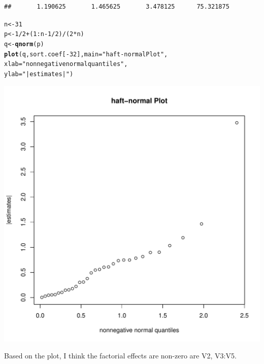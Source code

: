 \documentclass{article}\usepackage[]{graphicx}\usepackage[]{color}
\makeatletter
\def\maxwidth{ %
  \ifdim\Gin@nat@width>\linewidth
    \linewidth
  \else
    \Gin@nat@width
  \fi
}
\newcommand{\hlnum}[1]{\textcolor[rgb]{0.686,0.059,0.569}{#1}}%
\newcommand{\hlstr}[1]{\textcolor[rgb]{0.192,0.494,0.8}{#1}}%
\newcommand{\hlopt}[1]{\textcolor[rgb]{0,0,0}{#1}}%
\newcommand{\hlstd}[1]{\textcolor[rgb]{0.345,0.345,0.345}{#1}}%
\newcommand{\hlkwb}[1]{\textcolor[rgb]{0.69,0.353,0.396}{#1}}%
\newcommand{\hlkwc}[1]{\textcolor[rgb]{0.333,0.667,0.333}{#1}}%
\newcommand{\hlkwd}[1]{\textcolor[rgb]{0.737,0.353,0.396}{\textbf{#1}}}%
\newenvironment{kframe}{%
 \def\at@end@of@kframe{}%
 \ifinner\ifhmode%
  \def\at@end@of@kframe{\end{minipage}}%
  \begin{minipage}{\columnwidth}%
 \fi\fi%
 \def\FrameCommand##1{\hskip\@totalleftmargin \hskip-\fboxsep
 \colorbox{shadecolor}{##1}\hskip-\fboxsep
     \hskip-\linewidth \hskip-\@totalleftmargin \hskip\columnwidth}%
 \MakeFramed {\advance\hsize-\width
   \@totalleftmargin\z@ \linewidth\hsize
   \@setminipage}}%
 {\par\unskip\endMakeFramed%
 \at@end@of@kframe}
\newenvironment{knitrout}{}{} %
\makeatother
\begin{document}
\begin{knitrout}
\begin{kframe}
\begin{verbatim}
##       1.190625       1.465625       3.478125      75.321875
\end{verbatim}
\begin{alltt}
\hlstd{n} \hlkwb{<-} \hlnum{31}
\hlstd{p} \hlkwb{<-} \hlnum{1}\hlopt{/}\hlnum{2}\hlopt{+} \hlstd{(}\hlnum{1}\hlopt{:}\hlstd{n}\hlopt{-}\hlnum{1}\hlopt{/}\hlnum{2}\hlstd{)}\hlopt{/}\hlstd{(}\hlnum{2}\hlopt{*}\hlstd{n)}
\hlstd{q} \hlkwb{<-} \hlkwd{qnorm}\hlstd{(p)}
\hlkwd{plot}\hlstd{(q, sort.coef[}\hlopt{-}\hlnum{32}\hlstd{],} \hlkwc{main} \hlstd{=} \hlstr{"haft-normal Plot"}\hlstd{,}
     \hlkwc{xlab} \hlstd{=} \hlstr{"nonnegative normal quantiles"}\hlstd{,}
     \hlkwc{ylab} \hlstd{=} \hlstr{"|estimates|"}\hlstd{)}
\end{alltt}
\end{kframe}

{\centering \includegraphics[width=\maxwidth]{figure/minimal-unnamed-chunk-2} 

}



\end{knitrout}
Based on the plot, I think the factorial effects are non-zero are V2, V3:V5.
\end{document}
